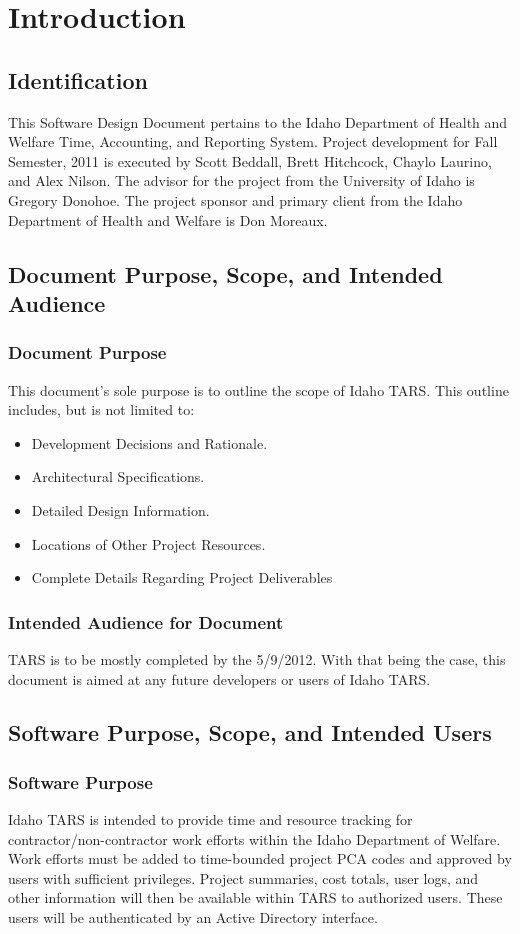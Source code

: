 \documentclass[letterpaper]{article}
\begin{document}
\pagebreak
\section{\bfseries{Introduction}}
\subsection{\bfseries{Identification}}
This Software Design Document pertains to the Idaho Department of Health and Welfare Time, Accounting, and Reporting System. Project development for Fall Semester, 2011 is executed by Scott Beddall, Brett Hitchcock, Chaylo Laurino, and Alex Nilson. The advisor for the project from the University of Idaho is Gregory Donohoe. The project sponsor and primary client from the Idaho Department of Health and Welfare is Don Moreaux. 
\subsection{\bfseries{Document Purpose, Scope, and Intended Audience}}
\subsubsection{Document Purpose}
This document's sole purpose is to outline the scope of Idaho TARS. This outline includes, but is not limited to:
\begin{itemize}
\item Development Decisions and Rationale.
\item Architectural Specifications.
\item Detailed Design Information.
\item Locations of Other Project Resources.
\item Complete Details Regarding Project Deliverables
\end{itemize}
\subsubsection{Intended Audience for Document}
TARS is to be mostly completed by the 5/9/2012. With that being the case, this document is aimed at any future developers or users of Idaho TARS. 

\subsection{\bfseries{Software Purpose, Scope, and Intended Users}}
\subsubsection{Software Purpose}
Idaho TARS is intended to provide time and resource tracking for contractor/non-contractor work efforts within the Idaho Department of Welfare. Work efforts must be added to time-bounded project PCA codes and approved by users with sufficient privileges. Project summaries, cost totals, user logs, and other information will then be available within TARS to authorized users. These users will be authenticated by an Active Directory interface.     
\end{document}
